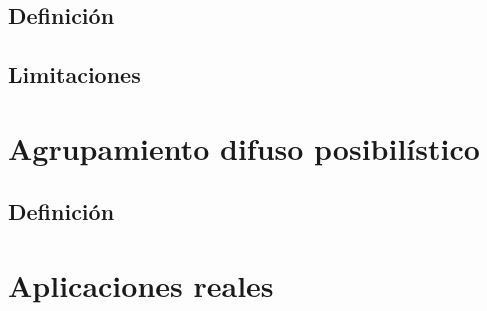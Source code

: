 \documentclass[]{report}
\begin{document}
		\section{Definición}
			
		
		\section{Limitaciones}
	
	\chapter{Agrupamiento difuso posibilístico}
	
		\section{Definición}
	
	\chapter{Aplicaciones reales}
	


\end{document}
